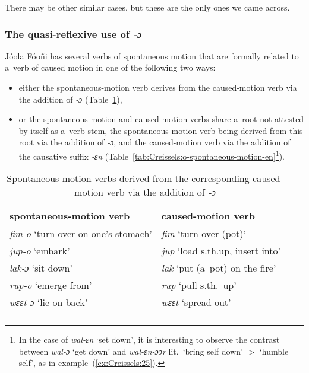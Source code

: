 \documentclass[output=paper]{langscibook}
\begin{document}
There may be other similar cases, but these are the only ones we came across.

\subsubsection{The quasi-reflexive use of \textit{‑ɔ}}%
\label{sec:Creissels:quasi-refl-o}

Jóola Fóoñi has several verbs of spontaneous motion that are formally related
to a~verb of caused motion in one of the following two ways:

\begin{itemize}
\item either the spontaneous-motion verb derives from the caused-motion verb
  via the addition of \textit{‑ɔ} (Table~\ref{tab:Creissels:o-spontaneous-motion}),
\item or the spontaneous-motion and caused-motion verbs share a~root not
  attested by itself as a~verb stem, the spontaneous-motion verb being derived
  from this root via the addition of \textit{‑ɔ}, and the caused-motion verb via
  the addition of the causative suffix \textit{‑ɛn}
  (Table~\ref{tab:Creissels:o-spontaneous-motion-en}\footnote{ In the case of
    \textit{wal-ɛn} `set down', it is interesting to observe the contrast between
    \textit{wal-ɔ} `get down' and \textit{wal-ɛn-ɔɔr} lit.\ `bring self down' $>$
    `humble self', as in example~(\ref{ex:Creissels:25}). }).
\end{itemize}

\begin{table}[ht]
  \centering
  \begin{tabular}{ll}
    \lsptoprule
    {spontaneous-motion verb} & {caused-motion verb} \\
    \hline
    \textit{fim-o} `turn over on one's stomach' & \textit{fim} `turn over (pot)' \\
    \textit{jup-o} `embark' & \textit{jup} `load s.th.up, insert into' \\
    \textit{lak-ɔ} `sit down' & \textit{lak} `put (a~pot) on the fire' \\
    \textit{rup-o} `emerge from' & \textit{rup} `pull s.th.\ up' \\
    \textit{wɛɛt-ɔ} `lie on back' & \textit{wɛɛt} `spread out' \\
    \lspbottomrule
  \end{tabular}
  \caption{Spontaneous-motion verbs derived from the corresponding
    caused-motion verb via the addition of \textit{‑ɔ}}%
  \label{tab:Creissels:o-spontaneous-motion}
\end{table}
\end{document}

